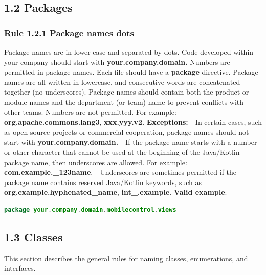 \subsection*{\textbf{1.2 Packages}}
\label{sec:1.2}
\subsubsection*{\textbf{Rule 1.2.1 Package names dots}}
\leavevmode\newline
Package names are in lower case and separated by dots. Code developed within your company should start with \textbf{your.company.domain.} Numbers are permitted in package names.
Each file should have a \textbf{package} directive.
Package names are all written in lowercase, and consecutive words are concatenated together (no underscores). Package names should contain both the product or module names and the department (or team) name to prevent conflicts with other teams.  Numbers are not permitted. For example: \textbf{org.apache.commons.lang3}, \textbf{xxx.yyy.v2}.
\textbf{Exceptions:} 
- In certain cases, such as open-source projects or commercial cooperation, package names should not start with \textbf{your.company.domain.}
- If the package name starts with a number or other character that cannot be used at the beginning of the Java/Kotlin package name, then underscores are allowed. For example: \textbf{com.example.\_123name}.
- Underscores are sometimes permitted if the package name contains reserved Java/Kotlin keywords, such as \textbf{org.example.hyphenated\_name}, \textbf{int\_.example}.
\textbf{Valid example}: 
\begin{lstlisting}[language=Kotlin]
package your.company.domain.mobilecontrol.views
\end{lstlisting}
\subsection*{\textbf{1.3 Classes}}
\label{sec:1.3}
This section describes the general rules for naming classes, enumerations, and interfaces.
